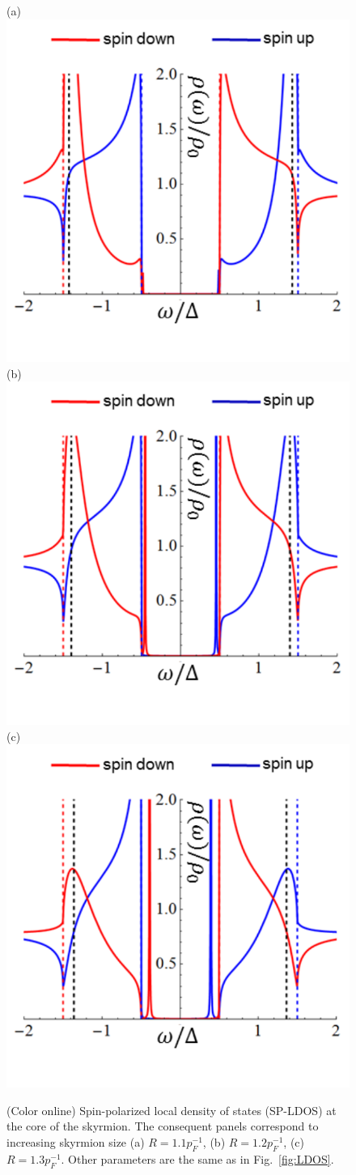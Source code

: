 \documentclass[twocolumn,showpacs,floatfix,nofootinbib,longbibliography]{revtex4-1}
\begin{document}
\begin{figure} \centering
	(a)\includegraphics[width=0.25\linewidth]{ApLDOSa} \hspace{0.1cm}
	(b)\includegraphics[width=0.25\linewidth]{ApLDOSb} \hspace{0.1cm}
	(c)\includegraphics[width=0.25\linewidth]{ApLDOSc} 
	\caption{(Color online) Spin-polarized local density of states (SP-LDOS)  at the core of the skyrmion. The consequent panels correspond to increasing skyrmion size (a) $R = 1.1 p_F^{-1}$, (b) $R = 1.2 p_F^{-1}$, (c) $R = 1.3 p_F^{-1}$. Other parameters are the same as in Fig.~\ref{fig:LDOS}. } \label{fig:ApLDOS}
\end{figure}

\end{document}
